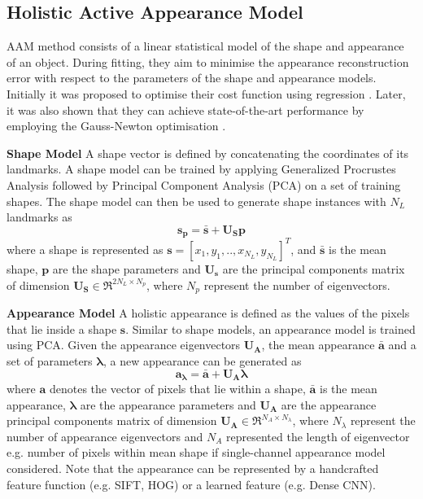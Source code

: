 \subsection{Holistic Active Appearance Model}
\label{sec:bg_aam}
AAM method consists of a linear statistical model of the shape and appearance of an object. During fitting, they aim to minimise the appearance reconstruction error with respect to the parameters of the shape and appearance models. Initially it was proposed to optimise their cost function using regression \cite{Cootes2001}. Later, it was also shown that they can achieve state-of-the-art performance by employing the Gauss-Newton optimisation \cite{Matthews2004,antonakos2015feature}.

\noindent\textbf{Shape Model}
A shape vector is defined by concatenating the coordinates of its landmarks. A shape model can be trained by applying Generalized Procrustes Analysis followed by Principal Component Analysis (PCA) on a set of training shapes. The shape model can then be used to generate shape instances with $N_L$ landmarks as
\begin{equation} 
\label{eq:shape_model}
\bm{s_p}=\bm{\bar{s}}+\bm{U_S}\bm{p}
\end{equation} 
where a shape is represented as $\bm{s}=[x_1,y_1,..,x_{N_L},y_{N_L}]^T$, and $\bm{\bar{s}}$ is the mean shape, $\bm{p}$ are the shape parameters and $\bm{U_s}$ are the principal components matrix of dimension $\bm{U_S} \in \Re^{2N_L\times N_p}$, where $N_p$ represent the number of eigenvectors.

\noindent\textbf{Appearance Model}
\label{sec:appearance_model}
A holistic appearance is defined as the values of the pixels that lie inside a shape $\bm{s}$. Similar to shape models, an appearance model is trained using PCA. Given the appearance eigenvectors $\bm{U_A}$, the mean appearance $\bm{\bar{a}}$ and a set of parameters $\bm{\lambda}$, a new appearance can be generated as 
\begin{equation} 
\label{eq:appearance_model}
\bm{a_\lambda}=\bm{\bar{a}}+\bm{U_A}\bm{\lambda}
\end{equation} 
where $\bm{a}$ denotes the vector of pixels that lie within a shape,  $\bm{\bar{a}}$ is the mean appearance, $\bm{\lambda}$ are the appearance parameters and $\bm{U_A}$ are the appearance principal components matrix of dimension $\bm{U_A} \in \Re^{N_A\times N_\lambda}$, where $N_\lambda$ represent the number of appearance eigenvectors and $N_A$ represented the length of eigenvector e.g. number of pixels within mean shape if single-channel appearance model considered. Note that the appearance can be represented by a handcrafted feature function (e.g. SIFT, HOG) or a learned feature (e.g. Dense CNN).

